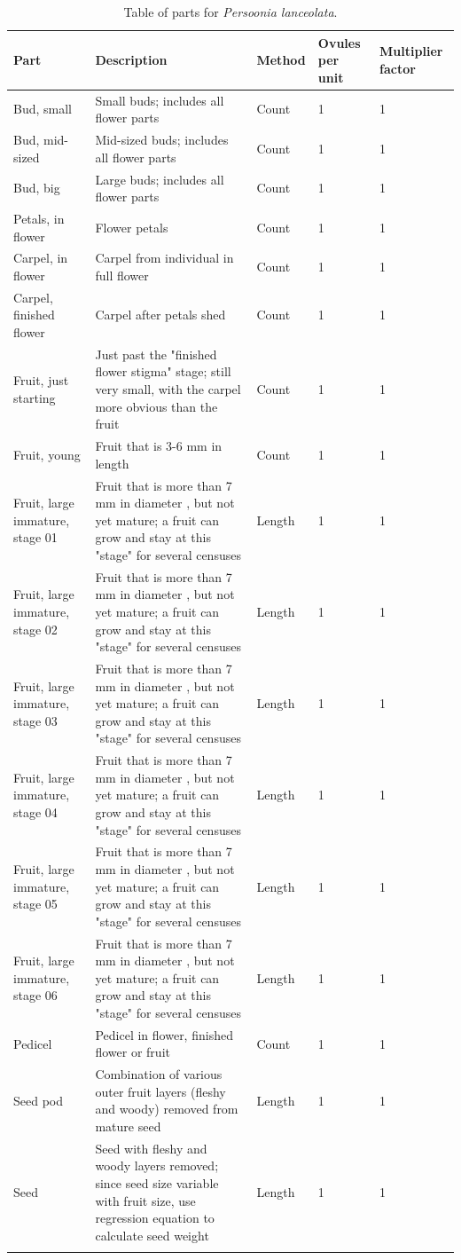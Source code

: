 \documentclass[10pt,twoside]{article}\usepackage[]{graphicx}\usepackage[]{color}
\begin{document}
\begingroup\small
\begin{longtable}{p{4.5cm}p{6cm}p{2cm}p{1cm}p{1cm}}
\caption{Table of parts for \emph{Persoonia lanceolata}.} \\ 
  \hline
Part & Description & Method & Ovules per unit & Multiplier factor \\ 
  \hline
Bud, small & Small buds; includes all flower parts & Count & 1 &   1 \\ 
  Bud, mid-sized & Mid-sized buds; includes all flower parts & Count & 1 &   1 \\ 
  Bud, big & Large buds; includes all flower parts & Count & 1 &   1 \\ 
  Petals, in flower & Flower petals & Count & 1 &   1 \\ 
  Carpel, in flower & Carpel from individual in full flower & Count & 1 &   1 \\ 
  Carpel, finished flower & Carpel after petals shed & Count & 1 &   1 \\ 
  Fruit, just starting & Just past the "finished flower stigma" stage; still very small, with the carpel more obvious than the fruit & Count & 1 &   1 \\ 
  Fruit, young & Fruit that is 3-6 mm in length & Count & 1 &   1 \\ 
  Fruit, large immature, stage 01 & Fruit that is more than 7 mm in diameter , but not yet mature; a fruit can grow and stay at this "stage" for several censuses & Length & 1 &   1 \\ 
  Fruit, large immature, stage 02 & Fruit that is more than 7 mm in diameter , but not yet mature; a fruit can grow and stay at this "stage" for several censuses & Length & 1 &   1 \\ 
  Fruit, large immature, stage 03 & Fruit that is more than 7 mm in diameter , but not yet mature; a fruit can grow and stay at this "stage" for several censuses & Length & 1 &   1 \\ 
  Fruit, large immature, stage 04 & Fruit that is more than 7 mm in diameter , but not yet mature; a fruit can grow and stay at this "stage" for several censuses & Length & 1 &   1 \\ 
  Fruit, large immature, stage 05 & Fruit that is more than 7 mm in diameter , but not yet mature; a fruit can grow and stay at this "stage" for several censuses & Length & 1 &   1 \\ 
  Fruit, large immature, stage 06 & Fruit that is more than 7 mm in diameter , but not yet mature; a fruit can grow and stay at this "stage" for several censuses & Length & 1 &   1 \\ 
  Pedicel & Pedicel in flower, finished flower or fruit & Count & 1 &   1 \\ 
  Seed pod & Combination of various outer fruit layers (fleshy and woody) removed from mature seed & Length & 1 &   1 \\ 
  Seed & Seed with fleshy and woody layers removed; since seed size variable with fruit size, use regression equation to calculate seed weight & Length & 1 &   1 \\ 
   \hline
\hline
\label{tab:parts_Persoonia_lanceolata}
\end{longtable}
\end{document}
